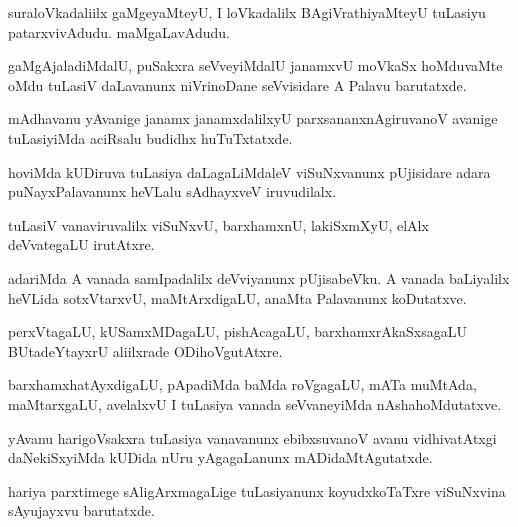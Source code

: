 \documentclass{article}
\begin{document}
\begin{mng}%
suraloVkadaliilx gaMgeyaMteyU, I loVkadalilx BAgiVrathiyaMteyU 
tuLasiyu patarxvivAdudu. maMgaLavAdudu.
\end{mng}

\begin{mng}%
gaMgAjaladiMdalU, puSakxra seVveyiMdalU janamxvU moVkaSx hoMduvaMte 
oMdu tuLasiV daLavanunx niVrinoDane seVvisidare A Palavu barutatxde.
\end{mng}

\begin{mng}%
mAdhavanu yAvanige janamx janamxdalilxyU parxsananxnAgiruvanoV avanige 
tuLasiyiMda aciRsalu budidhx huTuTxtatxde.
\end{mng}

\begin{mng}%
hoviMda kUDiruva tuLasiya daLagaLiMdaleV viSuNxvanunx pUjisidare adara 
puNayxPalavanunx heVLalu sAdhayxveV iruvudilalx.
\end{mng}

\begin{mng}%
tuLasiV vanaviruvalilx viSuNxvU, barxhamxnU, lakiSxmXyU, elAlx 
deVvategaLU irutAtxre.
\end{mng}

\begin{mng}%
adariMda A vanada samIpadalilx deVviyanunx pUjisabeVku. A vanada 
baLiyalilx heVLida sotxVtarxvU, maMtArxdigaLU, anaMta Palavanunx 
koDutatxve.
\end{mng}

\begin{mng}%
perxVtagaLU, kUSamxMDagaLU, pishAcagaLU, barxhamxrAkaSxsagaLU 
BUtadeYtayxrU aliilxrade ODihoVgutAtxre.
\end{mng}

\begin{mng}%
barxhamxhatAyxdigaLU, pApadiMda baMda roVgagaLU, mATa muMtAda, 
maMtarxgaLU, avelalxvU I tuLasiya vanada seVvaneyiMda nAshahoMdutatxve.
\end{mng}

\begin{mng}%
yAvanu harigoVsakxra tuLasiya vanavanunx ebibxsuvanoV avanu 
vidhivatAtxgi daNekiSxyiMda kUDida nUru yAgagaLanunx mADidaMtAgutatxde.
\end{mng}

\begin{mng}%
hariya parxtimege sAligArxmagaLige tuLasiyanunx koyudxkoTaTxre 
viSuNxvina sAyujayxvu barutatxde.
\end{mng}
\end{document}
